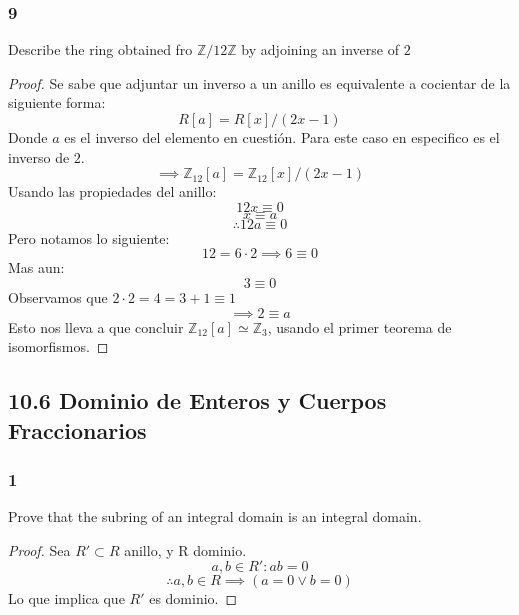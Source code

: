 \documentclass[11pt]{article}
\newcommand{\set}[1]{\mathbb{#1}}
\theoremstyle{definition}
\begin{document}
        \subsubsection{9}
        Describe the ring obtained fro $\set{Z}/12\set{Z}$ by adjoining an inverse of $2$
        \begin{proof}
            Se sabe que adjuntar un inverso a un anillo es equivalente a cocientar de la siguiente forma:
            \[R[a]=R[x]/(2x-1)\]
            Donde $a$ es el inverso del elemento en cuestión. Para este caso en especifico es el inverso de $2$.
            \[\implies\set{Z}_{12}[a]=\set{Z}_{12}[x]/(2x-1)\]
            Usando las propiedades del anillo:
            \[12x\equiv 0\]
            \[x\equiv a\]
            \[\therefore 12a\equiv 0\]
            Pero notamos lo siguiente:
            \[12=6\cdot 2\implies 6\equiv 0\]
            Mas aun:
            \[3\equiv 0\]
            Observamos que $2\cdot 2=4=3+1\equiv 1$
            \[\implies 2\equiv a\]
            Esto nos lleva a que concluir $\set{Z}_{12}[a]\simeq\set{Z}_3$, usando el primer teorema de isomorfismos.
        \end{proof}

        \subsection{10.6 Dominio de Enteros y Cuerpos Fraccionarios}
        \subsubsection{1}
        Prove that the subring of an integral domain is an integral domain.
        \begin{proof}
            Sea $R'\subset R$ anillo, y R dominio.
            \[a,b\in R': ab=0\]
            \[\therefore a,b\in R\implies(a=0\vee b=0)\]
            Lo que implica que $R'$ es dominio.
        \end{proof}
\end{document}
